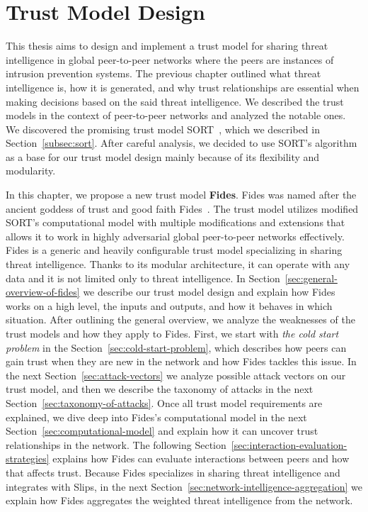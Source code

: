 \chapter{Trust Model Design}
\label{ch:trust-model-design}
This thesis aims to design and implement a trust model for sharing threat intelligence in global peer-to-peer networks where the peers are instances of intrusion prevention systems.
The previous chapter outlined what threat intelligence is, how it is generated, and why trust relationships are essential when making decisions based on the said threat intelligence.
We described the trust models in the context of peer-to-peer networks and analyzed the notable ones.
We discovered the promising trust model SORT~\cite{sort}, which we described in Section~\ref{subsec:sort}. After careful analysis, we decided to use SORT's algorithm as a base for our trust model design mainly because of its flexibility and modularity.

In this chapter, we propose a new trust model \textbf{Fides}.
Fides was named after the ancient goddess of trust and good faith Fides~\cite{enwiki:1086924565}.
The trust model utilizes modified SORT's computational model with multiple modifications and extensions that allows it to work in highly adversarial global peer-to-peer networks effectively.
Fides is a generic and heavily configurable trust model specializing in sharing threat intelligence.
Thanks to its modular architecture, it can operate with any data and it is not limited only to threat intelligence.
In Section~\ref{sec:general-overview-of-fides} we describe our trust model design and explain how Fides works on a high level, the inputs and outputs, and how it behaves in which situation. After outlining the general overview, we analyze the weaknesses of the trust models and how they apply to Fides.
First, we start with \textit{the cold start problem} in the Section~\ref{sec:cold-start-problem}, which describes how peers can gain trust when they are new in the network and how Fides tackles this issue.
In the next Section~\ref{sec:attack-vectors} we analyze possible attack vectors on our trust model, and then we describe the taxonomy of attacks in the next Section~\ref{sec:taxonomy-of-attacks}.
Once all trust model requirements are explained, we dive deep into Fides's computational model in the next Section~\ref{sec:computational-model}  and explain how it can uncover trust relationships in the network.
The following Section~\ref{sec:interaction-evaluation-strategies} explains how Fides can evaluate interactions between peers and how that affects trust.
Because Fides specializes in sharing threat intelligence and integrates with Slips, in the next Section~\ref{sec:network-intelligence-aggregation} we explain how Fides aggregates the weighted threat intelligence from the network.

